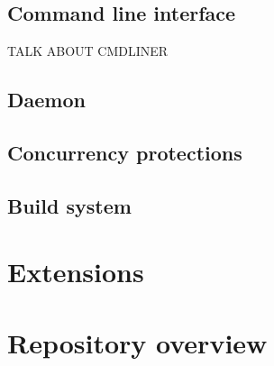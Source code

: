 \subsection{Command line interface}

TALK ABOUT CMDLINER

\subsection{Daemon}

\subsection{Concurrency protections}

\subsection{Build system}

\section{Extensions}

\section{Repository overview}

